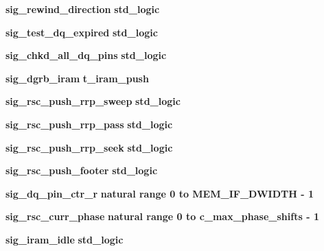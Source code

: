 \begin{DoxyCompactItemize}
\item 
{\bf sig\+\_\+rewind\+\_\+direction} {\bfseries \textcolor{comment}{std\+\_\+logic}\textcolor{vhdlchar}{ }} 
\item 
{\bf sig\+\_\+test\+\_\+dq\+\_\+expired} {\bfseries \textcolor{comment}{std\+\_\+logic}\textcolor{vhdlchar}{ }} 
\item 
{\bf sig\+\_\+chkd\+\_\+all\+\_\+dq\+\_\+pins} {\bfseries \textcolor{comment}{std\+\_\+logic}\textcolor{vhdlchar}{ }} 
\item 
{\bf sig\+\_\+dgrb\+\_\+iram} {\bfseries {\bfseries {\bf t\+\_\+iram\+\_\+push}} \textcolor{vhdlchar}{ }} 
\item 
{\bf sig\+\_\+rsc\+\_\+push\+\_\+rrp\+\_\+sweep} {\bfseries \textcolor{comment}{std\+\_\+logic}\textcolor{vhdlchar}{ }} 
\item 
{\bf sig\+\_\+rsc\+\_\+push\+\_\+rrp\+\_\+pass} {\bfseries \textcolor{comment}{std\+\_\+logic}\textcolor{vhdlchar}{ }} 
\item 
{\bf sig\+\_\+rsc\+\_\+push\+\_\+rrp\+\_\+seek} {\bfseries \textcolor{comment}{std\+\_\+logic}\textcolor{vhdlchar}{ }} 
\item 
{\bf sig\+\_\+rsc\+\_\+push\+\_\+footer} {\bfseries \textcolor{comment}{std\+\_\+logic}\textcolor{vhdlchar}{ }} 
\item 
{\bf sig\+\_\+dq\+\_\+pin\+\_\+ctr\+\_\+r} {\bfseries \textcolor{comment}{natural}\textcolor{vhdlchar}{ }\textcolor{vhdlchar}{ }\textcolor{vhdlchar}{ }\textcolor{keywordflow}{range}\textcolor{vhdlchar}{ }\textcolor{vhdlchar}{ } \textcolor{vhdldigit}{0} \textcolor{vhdlchar}{ }\textcolor{keywordflow}{to}\textcolor{vhdlchar}{ }\textcolor{vhdlchar}{ }\textcolor{vhdlchar}{ }\textcolor{vhdlchar}{ }{\bfseries {\bf M\+E\+M\+\_\+\+I\+F\+\_\+\+D\+W\+I\+D\+TH}} \textcolor{vhdlchar}{-\/}\textcolor{vhdlchar}{ } \textcolor{vhdldigit}{1} \textcolor{vhdlchar}{ }} 
\item 
{\bf sig\+\_\+rsc\+\_\+curr\+\_\+phase} {\bfseries \textcolor{comment}{natural}\textcolor{vhdlchar}{ }\textcolor{vhdlchar}{ }\textcolor{vhdlchar}{ }\textcolor{keywordflow}{range}\textcolor{vhdlchar}{ }\textcolor{vhdlchar}{ } \textcolor{vhdldigit}{0} \textcolor{vhdlchar}{ }\textcolor{keywordflow}{to}\textcolor{vhdlchar}{ }\textcolor{vhdlchar}{ }\textcolor{vhdlchar}{ }\textcolor{vhdlchar}{ }{\bfseries {\bf c\+\_\+max\+\_\+phase\+\_\+shifts}} \textcolor{vhdlchar}{-\/}\textcolor{vhdlchar}{ } \textcolor{vhdldigit}{1} \textcolor{vhdlchar}{ }} 
\item 
{\bf sig\+\_\+iram\+\_\+idle} {\bfseries \textcolor{comment}{std\+\_\+logic}\textcolor{vhdlchar}{ }} 

\end{DoxyCompactItemize}
